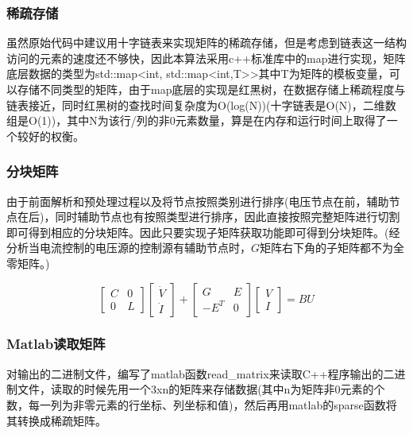 \documentclass[12pt]{article}
\begin{document}
\subsubsection{稀疏存储}
\qquad 虽然原始代码中建议用十字链表来实现矩阵的稀疏存储，但是考虑到链表这一结构访问的元素的速度还不够快，因此本算法采用c++标准库中的map进行实现，矩阵底层数据的类型为std::map<int, std::map<int,T>>其中T为矩阵的模板变量，可以存储不同类型的矩阵，由于map底层的实现是红黑树，在数据存储上稀疏程度与链表接近，同时红黑树的查找时间复杂度为O(log(N))(十字链表是O(N)，二维数组是O(1))，其中N为该行/列的非0元素数量，算是在内存和运行时间上取得了一个较好的权衡。\par
\subsubsection{分块矩阵}
\qquad 由于前面解析和预处理过程以及将节点按照类别进行排序(电压节点在前，辅助节点在后)，同时辅助节点也有按照类型进行排序，因此直接按照完整矩阵进行切割即可得到相应的分块矩阵。因此只要实现子矩阵获取功能即可得到分块矩阵。(经分析当电流控制的电压源的控制源有辅助节点时，$G$矩阵右下角的子矩阵都不为全零矩阵。)\par
\begin{equation*}
  \left[\begin{array}{ll}
  C & 0 \\
  0 & L
  \end{array}\right]\left[\begin{array}{l}
  \dot{V} \\
  \dot{I}
  \end{array}\right]+\left[\begin{array}{cc}
  G & E \\
  -E^T & 0
  \end{array}\right]\left[\begin{array}{l}
  V \\
  I
  \end{array}\right]=B U
\end{equation*}

\subsubsection{Matlab读取矩阵}
\qquad 对输出的二进制文件，编写了matlab函数read\_matrix来读取C++程序输出的二进制文件，读取的时候先用一个3xn的矩阵来存储数据(其中n为矩阵非0元素的个数，每一列为非零元素的行坐标、列坐标和值)，然后再用matlab的sparse函数将其转换成稀疏矩阵。\par
\end{document}
